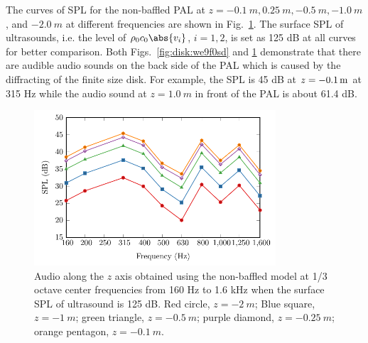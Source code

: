 The curves of SPL for the non-baffled PAL at $z = \SI{-0.1}{m}, \SI{0.25}{m}, \SI{-0.5}{m}, \SI{-1.0}{m}$, and $\SI{-2.0}{m}$ at different frequencies are shown in Fig.~\ref{fig:disk:123489}. 
The surface SPL of ultrasounds, i.e. the level of $\rho_0c_0\abs{v_i}$, $i = 1, 2$, is set as 125 dB at all curves for better comparison. 
Both Figs.~\ref{fig:disk:we9f0sd} and \ref{fig:disk:123489} demonstrate that there are audible audio sounds on the back side of the PAL which is caused by the diffracting of the finite size disk. 
For example, the SPL is 45 dB at $z = \SI{- 0.1 }{m}$ at 315 Hz while the audio sound at $z = \SI{1.0}{m}$ in front of the PAL is about 61.4 dB.

\begin{figure}[htb]
    \centering
    \includegraphics[width = 9cm]{fig/CompareSplOctave.pdf}
    \caption{Audio  along the $z$ axis obtained using the non-baffled model at 1/3 octave center frequencies from 160 Hz to 1.6 kHz when the surface SPL of ultrasound is 125 dB. 
    Red circle, $z=\SI{-2}{m}$; Blue square, $z=\SI{-1}{m}$; green triangle, $z =\SI{-0.5}{m}$; purple diamond, $z=\SI{-0.25}{m}$; orange pentagon, $z=\SI{-0.1}{m}$.}
    \label{fig:disk:123489}
\end{figure}

